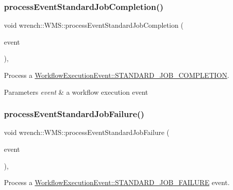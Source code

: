\subsubsection{\texorpdfstring{process\+Event\+Standard\+Job\+Completion()}{processEventStandardJobCompletion()}}
{\footnotesize\ttfamily void wrench\+::\+W\+M\+S\+::process\+Event\+Standard\+Job\+Completion (\begin{DoxyParamCaption}\item[{std\+::unique\+\_\+ptr$<$ \hyperlink{classwrench_1_1_standard_job_completed_event}{Standard\+Job\+Completed\+Event} $>$}]{event }\end{DoxyParamCaption})\hspace{0.3cm}{\ttfamily [protected]}, {\ttfamily [virtual]}}



Process a \hyperlink{classwrench_1_1_workflow_execution_event_a5611165191fbc4d121d1b141c748a448a68fddb8efa42e1c770438578f6bac474}{Workflow\+Execution\+Event\+::\+S\+T\+A\+N\+D\+A\+R\+D\+\_\+\+J\+O\+B\+\_\+\+C\+O\+M\+P\+L\+E\+T\+I\+ON}. 


\begin{DoxyParams}{Parameters}
{\em event} & a workflow execution event \\
\hline
\end{DoxyParams}
\mbox{\label{classwrench_1_1_w_m_s_a1e33e5ae8d04d96eb8e03444d78a5c52}} 
\subsubsection{\texorpdfstring{process\+Event\+Standard\+Job\+Failure()}{processEventStandardJobFailure()}}
{\footnotesize\ttfamily void wrench\+::\+W\+M\+S\+::process\+Event\+Standard\+Job\+Failure (\begin{DoxyParamCaption}\item[{std\+::unique\+\_\+ptr$<$ \hyperlink{classwrench_1_1_standard_job_failed_event}{Standard\+Job\+Failed\+Event} $>$}]{event }\end{DoxyParamCaption})\hspace{0.3cm}{\ttfamily [protected]}, {\ttfamily [virtual]}}



Process a \hyperlink{classwrench_1_1_workflow_execution_event_a5611165191fbc4d121d1b141c748a448a50337d50da65b812bfdf450bf18fa266}{Workflow\+Execution\+Event\+::\+S\+T\+A\+N\+D\+A\+R\+D\+\_\+\+J\+O\+B\+\_\+\+F\+A\+I\+L\+U\+RE} event. 



